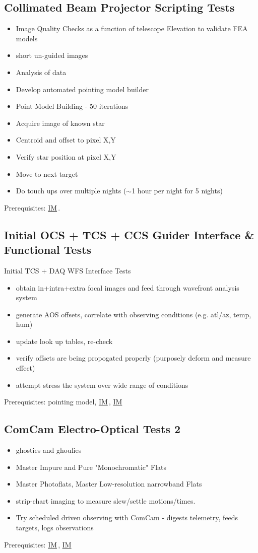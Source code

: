 \documentclass[SE,authoryear,toc]{lsstdoc}
\newcommand{\IM}[1]{\hyperref[IM:#1]{\color{blue}IM$_{\text{\csname nameIM#1\endcsname}}$}}
\begin{document}
\subsection{Collimated Beam Projector Scripting Tests}

\begin{itemize}
\item Image Quality Checks as a function of telescope Elevation to validate FEA models
\item short un-guided images
\item Analysis of data
\item Develop automated pointing model builder
\item Point Model Building - 50 iterations
\item Acquire image of known star
\item Centroid and offset to pixel X,Y
\item Verify star position at pixel X,Y
\item Move to next target
\item Do touch ups over multiple nights ($\sim$1 hour per night for 5 nights)
\end{itemize}
Prerequisites: \IM{cbp}.

\subsection{Initial OCS + TCS + CCS Guider Interface \& Functional Tests}

Initial TCS + DAQ WFS Interface Tests
\begin{itemize}
\item obtain in+intra+extra focal images and feed through wavefront analysis system
\item generate AOS offsets, correlate with observing conditions (e.g. atl/az, temp, hum)
\item update look up tables, re-check
\item verify offsets are being propogated properly (purposely deform and measure effect)
\item attempt stress the system over wide range of conditions
\end{itemize}
Prerequisites: pointing model, \IM{b}, \IM{g}
  
\subsection{ComCam Electro-Optical Tests 2}

\begin{itemize}
\item ghosties and ghoulies
\item Master Impure and Pure "Monochromatic" Flats
\item Master Photoflats, Master Low-resolution narrowband Flats
\item strip-chart imaging to measure slew/settle motions/times.
\item Try scheduled driven observing with ComCam - digests telemetry, feeds targets, logs observations
\end{itemize}
Prerequisites: \IM{b}, \IM{g}
\end{document}
